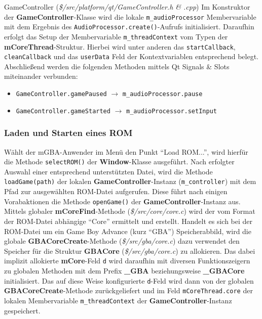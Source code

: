 \documentclass[11pt,a4paper]{scrartcl}
\begin{document}
\vspace{5mm}
\large GameController \normalsize(\textit{\$/src/platform/qt/GameController.h \& .cpp})
\vspace{2mm}\newline
Im Konstruktor der \textbf{GameController}-Klasse wird die lokale \verb|m_audioProcessor| Membervariable mit dem Ergebnis des \verb|AudioProcessor.create()|-Aufrufs initialisiert. Daraufhin erfolgt das Setup der Membervariable \verb|m_threadContext| vom Typen der \textbf{mCoreThread}-Struktur. Hierbei wird unter anderen das \verb|startCallback|, \verb|cleanCallback| und das \verb|userData| Feld der Kontextvariablen entsprechend belegt. Abschlie{\ss}end werden die folgenden Methoden mittels Qt Signals \& Slots miteinander verbunden:

\begin{itemize}
    \item \verb|GameController.gamePaused| $\rightarrow$ \verb|m_audioProcessor.pause|
    \item \verb|GameController.gameStarted| $\rightarrow$ \verb|m_audioProcessor.setInput|
\end{itemize}


\subsubsection{Laden und Starten eines ROM}

W\"ahlt der mGBA-Anwender im Men\"u den Punkt \enquote{Load ROM...}, wird hierf\"ur die Methode \verb|selectROM()| der \textbf{Window}-Klasse ausgef\"uhrt. Nach erfolgter Auswahl einer entsprechend unterst\"utzten Datei, wird die Methode \verb|loadGame(path)|  der lokalen \textbf{GameController}-Instanz (\verb|m_controller|) mit dem Pfad zur ausgew\"ahlten ROM-Datei aufgerufen. Diese f\"uhrt nach einigen Vorabaktionen die Methode \verb|openGame()| der \textbf{GameController}-Instanz aus. Mittels globaler \textbf{mCoreFind}-Methode (\textit{\$/src/core/core.c}) wird der vom Format der ROM-Datei abh\"angige \enquote{Core} ermittelt und erstellt. Handelt es sich bei der ROM-Datei um ein Game Boy Advance (kurz \enquote{GBA}) Speicherabbild, wird die globale \textbf{GBACoreCreate}-Methode (\textit{\$/src/gba/core.c}) dazu verwendet den Speicher f\"ur die Struktur \textbf{GBACore} (\textit{\$/src/gba/core.c}) zu allokieren. Das dabei implizit allokierte \textbf{mCore}-Feld \verb|d| wird daraufhin mit diversen Funktionszeigern zu globalen Methoden mit dem Prefix \textbf{{\_}GBA} beziehungsweise \textbf{{\_}GBACore} initialisiert. Das auf diese Weise konfigurierte \verb|d|-Feld wird dann von der globalen \textbf{GBACoreCreate}-Methode zur\"uckgeliefert und im Feld \verb|mCoreThread.core| der lokalen Membervariable \verb|m_threadContext| der \textbf{GameController}-Instanz gespeichert.
\end{document}
